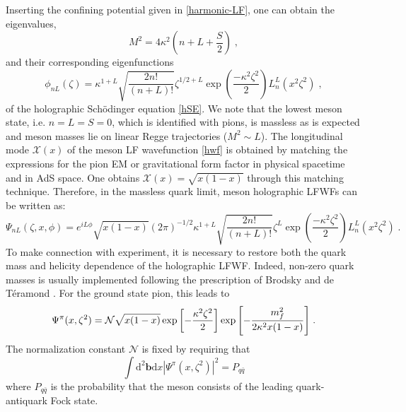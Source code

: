 \documentclass{PoS}
\newcommand{\be}{\begin{equation}}
\newcommand{\ee}{\end{equation}}
\begin{document}
Inserting the confining potential given in \eqref{harmonic-LF}, one can obtain the eigenvalues,
\begin{equation}
	M^2= 4\kappa^2 \left(n+L +\frac{S}{2}\right)\;,
	\label{mass-Regge}
\end{equation}
and their corresponding eigenfunctions
\begin{equation}
	\phi_{nL}(\zeta)= \kappa^{1+L} \sqrt{\frac{2 n !}{(n+L)!}} \zeta^{1/2+L} \exp{\left(\frac{-\kappa^2 \zeta^2}{2}\right)} L_n^L(x^2 \zeta^2) \;,
	\label{phi-zeta}
\end{equation}
of the holographic Sch\" odinger equation \eqref{hSE}.  We note that the lowest meson state, i.e. $n=L=S=0$, which is identified with pions, is massless as is expected and meson masses lie on linear Regge trajectories ($M^2\sim L$).  The longitudinal mode $\mathcal{X}(x)$ of the meson LF wavefunction \eqref{hwf} is obtained by matching the expressions for the pion EM or gravitational form factor in physical spacetime and in AdS space. One obtains $\mathcal{X}(x)=\sqrt{x(1-x)}$ \cite{deTeramond:2008ht,Brodsky:2008pf} through this matching technique. Therefore,  in the massless quark limit, meson holographic LFWFs can be written as:
\begin{equation}
	\Psi_{nL}(\zeta, x, \phi)= e^{iL\phi} \sqrt{x(1-x)} (2\pi)^{-1/2}\kappa^{1+L} \sqrt{\frac{2 n !}{(n+L)!}} \zeta^{L} \exp{\left(\frac{-\kappa^2 \zeta^2}{2}\right)} L_n^L(x^2 \zeta^2)\;.
\end{equation}
To make connection with experiment, it is necessary to restore both the quark mass and helicity dependence of the holographic LFWF. Indeed, non-zero quark masses is usually implemented following the prescription of Brodsky and de T\'eramond \cite{Brodsky:2008pg}. For the ground state pion, this leads to 
\be  
\Psi^{\pi} (x,\zeta^2) = \mathcal{N} \sqrt{x (1-x)}  \exp{ \left[ -{ \kappa^2 \zeta^2  \over 2} \right] }
\exp{ \left[ -{m_f^2 \over 2 \kappa^2 x(1-x) } \right]}\;.
\label{hwf}
\ee
The normalization constant $\mathcal{N}$ is fixed by requiring that
\begin{equation}
	\int \mathrm{d}^2 \mathbf{b} \mathrm{d} x |\Psi^{\pi}(x,\zeta^2)|^2 = P_{q\bar{q}} 
	\label{norm}
\end{equation}
where $P_{q\bar{q}}$ is the probability that the meson consists of the leading quark-antiquark Fock state.  
\end{document}
